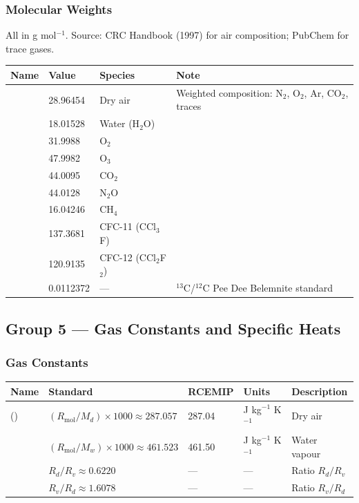 \subsubsection{Molecular Weights}

All in g mol$^{-1}$. Source: CRC Handbook (1997) for air composition;
PubChem for trace gases.

\begin{longtable}{L{3cm} L{3cm} L{4cm} L{4cm}}
  \toprule
  \textbf{Name} & \textbf{Value} & \textbf{Species} & \textbf{Note} \\
  \midrule
  \endhead
  \bottomrule
  \endfoot
      & 28.96454  & Dry air          & Weighted composition: N$_2$, O$_2$, Ar, CO$_2$, traces \\
      & 18.01528  & Water (H$_2$O)   & \\
     & 31.9988   & O$_2$            & \\
     & 47.9982   & O$_3$            & \\
    & 44.0095   & CO$_2$           & \\
    & 44.0128   & N$_2$O           & \\
    & 16.04246  & CH$_4$           & \\
  & 137.3681  & CFC-11 (CCl$_3$F)& \\
  & 120.9135  & CFC-12 (CCl$_2$F$_2$)& \\
  & 0.0112372& ---              & $^{13}$C/$^{12}$C Pee Dee Belemnite standard \\
\end{longtable}

\subsection{Group 5 --- Gas Constants and Specific Heats}

\subsubsection{Gas Constants}

\begin{longtable}{L{2.8cm} L{3.5cm} L{3cm} L{2cm} L{2.5cm}}
  \toprule
  \textbf{Name} & \textbf{Standard} & \textbf{RCEMIP} & \textbf{Units} & \textbf{Description} \\
  \midrule
  \endhead
  \bottomrule
  \endfoot
   () & $(R_\text{mol}/M_d)\times1000\approx287.057$ & 287.04 & J kg$^{-1}$ K$^{-1}$ & Dry air \\
                 & $(R_\text{mol}/M_w)\times1000\approx461.523$ & 461.50 & J kg$^{-1}$ K$^{-1}$ & Water vapour \\
                 & $R_d/R_v\approx0.6220$ & --- & --- & Ratio $R_d/R_v$ \\
                & $R_v/R_d\approx1.6078$ & --- & --- & Ratio $R_v/R_d$ \\
\end{longtable}

